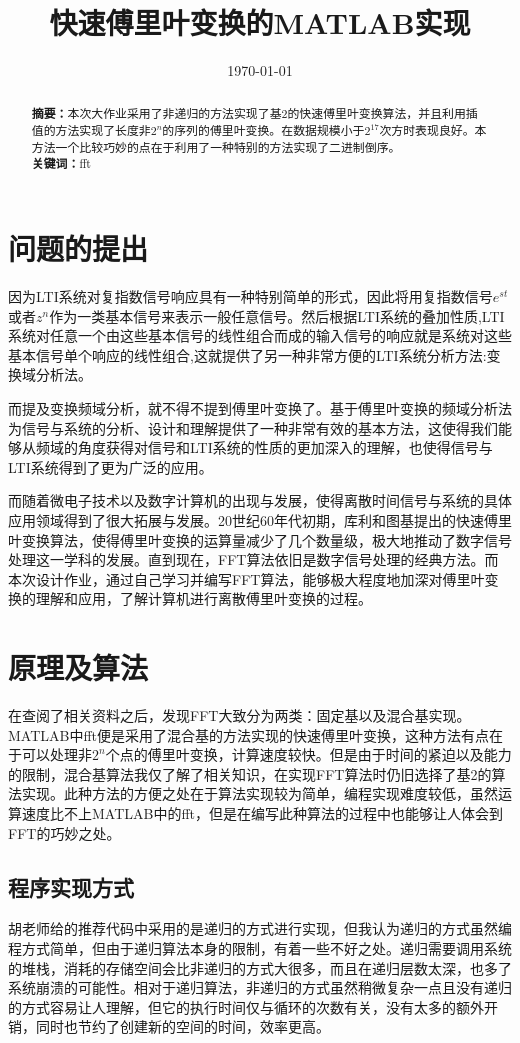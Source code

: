 \documentclass{../source/zju}
\title{\zihao{4} \bf{快速傅里叶变换的MATLAB实现}}
\author{\zihao{5} }
\date{}
\date{\today}
\begin{document}
\makecover
\maketitle
\begin{abstract}
    \noindent
    {\bf 摘要：}本次大作业采用了非递归的方法实现了基2的快速傅里叶变换算法，并且利用插值的方法实现了长度非$2^n$的序列的傅里叶变换。在数据规模小于$2^{17}$次方时表现良好。本方法一个比较巧妙的点在于利用了一种特别的方法实现了二进制倒序。\\
    {\bf 关键词：}fft
\end{abstract}

\section{问题的提出}
因为LTI系统对复指数信号响应具有一种特别简单的形式，因此将用复指数信号$e^{st}$或者$z^n$作为一类基本信号来表示一般任意信号。然后根据LTI系统的叠加性质,LTI系统对任意一个由这些基本信号的线性组合而成的输入信号的响应就是系统对这些基本信号单个响应的线性组合,这就提供了另一种非常方便的LTI系统分析方法:变换域分析法。

而提及变换频域分析，就不得不提到傅里叶变换了。基于傅里叶变换的频域分析法为信号与系统的分析、设计和理解提供了一种非常有效的基本方法，这使得我们能够从频域的角度获得对信号和LTI系统的性质的更加深入的理解，也使得信号与LTI系统得到了更为广泛的应用。

而随着微电子技术以及数字计算机的出现与发展，使得离散时间信号与系统的具体应用领域得到了很大拓展与发展。20世纪60年代初期，库利和图基提出的快速傅里叶变换算法，使得傅里叶变换的运算量减少了几个数量级，极大地推动了数字信号处理这一学科的发展。直到现在，FFT算法依旧是数字信号处理的经典方法。而本次设计作业，通过自己学习并编写FFT算法，能够极大程度地加深对傅里叶变换的理解和应用，了解计算机进行离散傅里叶变换的过程。

\section{原理及算法}
在查阅了相关资料之后，发现FFT大致分为两类：固定基以及混合基实现。MATLAB中fft便是采用了混合基的方法实现的快速傅里叶变换，这种方法有点在于可以处理非$2^n$个点的傅里叶变换，计算速度较快。但是由于时间的紧迫以及能力的限制，混合基算法我仅了解了相关知识，在实现FFT算法时仍旧选择了基2的算法实现。此种方法的方便之处在于算法实现较为简单，编程实现难度较低，虽然运算速度比不上MATLAB中的fft，但是在编写此种算法的过程中也能够让人体会到FFT的巧妙之处。
\subsection{程序实现方式}
胡老师给的推荐代码中采用的是递归的方式进行实现，但我认为递归的方式虽然编程方式简单，但由于递归算法本身的限制，有着一些不好之处。递归需要调用系统的堆栈，消耗的存储空间会比非递归的方式大很多，而且在递归层数太深，也多了系统崩溃的可能性。相对于递归算法，非递归的方式虽然稍微复杂一点且没有递归的方式容易让人理解，但它的执行时间仅与循环的次数有关，没有太多的额外开销，同时也节约了创建新的空间的时间，效率更高。
\end{document}
